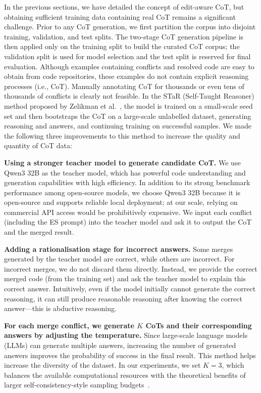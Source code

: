 \documentclass[sigconf,review,anonymous]{acmart}
\newcommand{\stma}[1]{\todo[inline]{\textcolor{black}{#1}}}
\begin{document}
In the previous sections, we have detailed the concept of edit-aware CoT, but obtaining sufficient training data containing real CoT remains a significant challenge. Prior to any CoT generation, we first partition the corpus into disjoint training, validation, and test splits. The two-stage CoT generation pipeline is then applied only on the training split to build the curated CoT corpus; the validation split is used for model selection and the test split is reserved for final evaluation. 
Although examples containing conflicts and resolved code are easy to obtain from code repositories, these examples do not contain explicit reasoning processes (i.e., CoT). 
Manually annotating CoT for thousands or even tens of thousands of conflicts is clearly not feasible. 
In the STaR (Self-Taught Reasoner) method proposed by Zelikman et al.~\cite{star}, the model is trained on a small-scale seed set and then bootstraps the CoT on a large-scale unlabelled dataset, generating reasoning and answers, and continuing training on successful samples. 
We made the following three improvements to this method to increase the quality and quantity of CoT data:

\textbf{Using a stronger teacher model to generate candidate CoT.} We use Qwen3 32B as the teacher model, which has powerful code understanding and generation capabilities with high efficiency. In addition to its strong benchmark performance among open-source models, we choose Qwen3 32B because it is open-source and supports reliable local deployment; at our scale, relying on commercial API access would be prohibitively expensive. We input each conflict (including the ES prompt) into the teacher model and ask it to output the CoT and the merged result.

\textbf{Adding a rationalisation stage for incorrect answers.} Some merges generated by the teacher model are correct, while others are incorrect. For incorrect merges, we do not discard them directly. Instead, we provide the correct merged code (from the training set) and ask the teacher model to explain this correct answer. 
Intuitively, even if the model initially cannot generate the correct reasoning, it can still produce reasonable reasoning after knowing the correct answer—this is abductive reasoning.

\textbf{For each merge conflict, we generate $K$ CoTs and their corresponding answers by adjusting the temperature.} Since large-scale language models (LLMs) can generate multiple answers, increasing the number of generated answers improves the probability of success in the final result. This method helps increase the diversity of the dataset. In our experiments, we set $K=3$, which balances the available computational resources with the theoretical benefits of larger self-consistency-style sampling budgets~\cite{wang2022selfconsistencyArXiv}.
\end{document}
